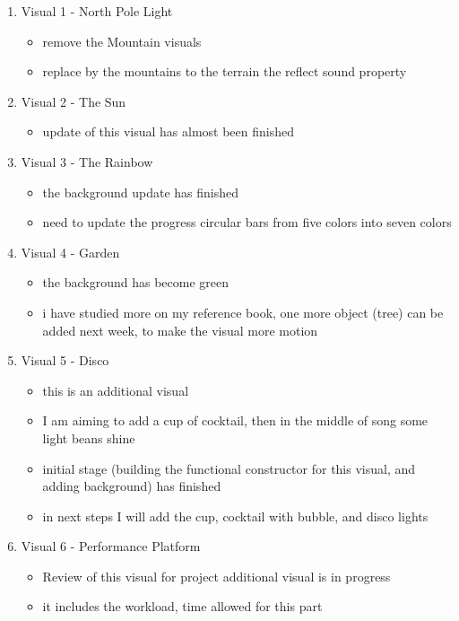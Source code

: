 \begin{enumerate}
  \item Visual 1 - North Pole Light
    \begin{itemize}
      \item remove the Mountain visuals
      \item replace by the mountains to the terrain the reflect sound property
    \end{itemize}
  \item Visual 2 - The Sun
    \begin{itemize}
      \item update of this visual has almost been finished
    \end{itemize}
  \item Visual 3 - The Rainbow
    \begin{itemize}
      \item the background update has finished
      \item need to update the progress circular bars from five colors into seven colors
    \end{itemize}
  \item Visual 4 - Garden
    \begin{itemize}
      \item the background has become green
      \item i have studied more on my reference book, one more object (tree) can be added next week, to make the visual more motion
    \end{itemize}
  \item Visual 5 - Disco
    \begin{itemize}
      \item this is an additional visual
      \item I am aiming to add a cup of cocktail, then in the middle of song some light beans shine
      \item initial stage (building the functional constructor for this visual, and adding background) has finished
      \item in next steps I will add the cup, cocktail with bubble, and disco lights
    \end{itemize}
  \item Visual 6 - Performance Platform
    \begin{itemize}
      \item Review of this visual for project additional visual is in progress
      \item it includes the workload, time allowed for this part
    \end{itemize}
\end{enumerate}

